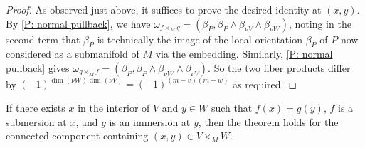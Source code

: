 \begin{proof}
	As observed just above, it suffices to prove the desired identity at $(x,y)$.
	By \cref{P: normal pullback}, we have $\omega_{f \times_M g} = (\beta_P, \beta_P \wedge \beta_{\nu V} \wedge \beta_{\nu W})$, noting in the second term that $\beta_P$ is technically the image of the local orientation $\beta_P$ of $P$ now considered as a submanifold of $M$ via the embedding.
	Similarly, \cref{P: normal pullback} gives
	$\omega_{g \times_M f} = (\beta_P,\beta_P \wedge \beta_{\nu W} \wedge \beta_{\nu V})$.
	So the two fiber products differ by $(-1)^{\dim(\nu W)\dim(\nu V)} = (-1)^{(m-v)(m-w)}$ as required.
\end{proof}

\begin{lemma}\label{L: im/sub}
	If there exists $x$ in the interior of $V$ and $y \in W$ such that $f(x) = g(y)$, $f$ is a submersion at $x$, and $g$ is an immersion at $y$, then the theorem holds for the connected component containing $(x,y) \in V \times_M W$.
\end{lemma}

